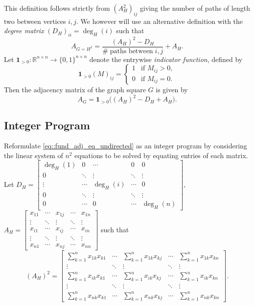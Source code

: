 \documentclass[11pt]{article}
\begin{document}
This definition follows strictly from $(A_H^2)_{ij}$ giving the number of paths of length two between 
vertices $i, j$. We however will use an 
alternative definition with the \emph{degree matrix} $(D_H)_{ii} = \deg_H(i)$ such that 
\[
A_{G = H^2} = \frac{(A_H)^2 - D_H}{\# \; \text{paths between} \; i, j} + A_H. 
\]
Let $\mathbf{1}_{>0} : \mathbb{R}^{n \times n} \to \{0,1\}^{n \times n}$ denote the entrywise \emph{indicator function}, defined by
\[
\mathbf{1}_{>0}(M)_{ij} =
\begin{cases}
1 & \text{if } M_{ij} > 0, \\
0 & \text{if } M_{ij} = 0.
\end{cases}
\]
Then the adjacency matrix of the graph square $G$ is given by 
\begin{equation} \label{eq::fund_adj_eq_undirected}
    A_G = \mathbf{1}_{> 0}\!\big((A_H)^2 - D_H + A_H\big).
\end{equation}

\subsection{Integer Program} \label{subsec::IP}

Reformulate \eqref{eq::fund_adj_eq_undirected} as an integer program by considering the linear system of 
$n^2$ equations to be solved by equating entries of each matrix. \\
Let 
$\displaystyle 
D_H =
\begin{bmatrix}
\deg_H(1) & 0      & \cdots & 0 & 0      \\
0         & \ddots & \vdots & \ddots & \vdots \\
\vdots    & \cdots & \deg_H(i) & \cdots & 0      \\
0         & \ddots & \vdots & \ddots & \vdots \\
0         & \cdots & 0      & \cdots & \deg_H(n)
\end{bmatrix}, 
$ 
$\displaystyle A_H =
\begin{bmatrix}
x_{11} & \cdots & x_{1j} & \cdots & x_{1n} \\
\vdots  & \ddots  & \vdots & \ddots & \vdots  \\
x_{i1} & \cdots & x_{ij} & \cdots & x_{in} \\
\vdots  & \ddots  & \vdots & \ddots & \vdots  \\
x_{n1} & \cdots & x_{nj} & \cdots & x_{nn}
\end{bmatrix}
$ such that 
\[
(A_H)^2 = \begin{bmatrix}
\displaystyle \sum_{k=1}^n x_{1k}x_{k1} & \cdots & \displaystyle \sum_{k=1}^n x_{1k}x_{kj} & \cdots & \displaystyle \sum_{k=1}^n x_{1k}x_{kn} \\
\vdots  & \ddots  & \vdots & \ddots & \vdots  \\
\displaystyle \sum_{k=1}^n x_{ik}x_{k1} & \cdots & \displaystyle \sum_{k=1}^n x_{ik}x_{kj} & \cdots & \displaystyle \sum_{k=1}^n x_{ik}x_{kn} \\
\vdots  & \ddots  & \vdots & \ddots & \vdots  \\
\displaystyle \sum_{k=1}^n x_{nk}x_{k1} & \cdots & \displaystyle \sum_{k=1}^n x_{nk}x_{kj} & \cdots & \displaystyle \sum_{k=1}^n x_{nk}x_{kn}
\end{bmatrix}.
\]
\end{document}
